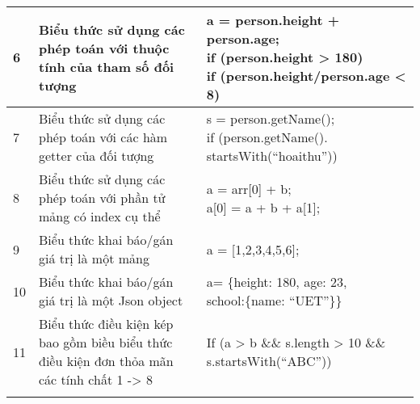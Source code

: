 \begin{longtable}{ |p{1cm}|p{7cm}|p{}|}
        \hline
        6 & Biểu thức sử dụng các phép toán với thuộc tính của tham số đối tượng   & \makecell[l]{a = person.height + person.age;\\
        if (person.height > 180)\\
        if (person.height/person.age <  8)} 
        \\ 
        \hline
        7 & Biểu thức sử dụng các phép toán với các hàm getter của đối tượng & \makecell[l]{s = person.getName();\\
        if (person.getName().\\startsWith(“hoaithu”))} 
        \\
         \hline
        8 & Biểu thức sử dụng các phép toán với phần tử mảng có index cụ thể &\makecell[l]{ a = arr[0] + b; \\
        a[0] = a + b + a[1];} 
        \\
         \hline
        9 & Biểu thức khai báo/gán giá trị là một mảng & a = [1,2,3,4,5,6];\\
         \hline
        10 &Biểu thức khai báo/gán giá trị là một Json object & \makecell[l]{a= \{height: 180, age: 23, \\school:\{name: “UET”\}\}}\\
         \hline
        11 & Biểu thức điều kiện kép bao gồm biều biểu thức điều kiện đơn thỏa mãn các tính chất 1 -> 8 & If (a > b \&\& s.length > 10 \&\& s.startsWith(“ABC”))\\
         \hline
    \label{table:expressions}
\end{longtable}